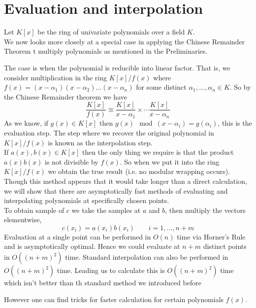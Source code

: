 
\chapter{Evaluation and interpolation}\label{chapter2}

Let $K[x]$ be the ring of univariate polynomials over a field $K$.\\
We now looks more closely at a special case in applying the Chinese Remainder Theorem t multiply polynomials as mentioned in the Preliminaries.

The case is when the polynomial is reducible into linear factor. That is, we consider multiplication in the ring $K[x] / f(x)$ where $f(x) = (x - \alpha_1)(x - \alpha_2) \ldots (x - \alpha_n)$ for some distinct $\alpha_1, \ldots, \alpha_n \in K$. So by the Chinese Remainder theorem we have
\[
    \frac{K[x]}{f(x)} \cong \frac{K[x]}{x - \alpha_1} \times \cdots \frac{K[x]}{x - \alpha_n}
\]
As we know, if $g(x) \in K[x]$ then $g(x) \mod (x - \alpha_i) = g(\alpha_i)$, this is the evaluation step. The step where we recover the original polynomial in $K[x]/f(x)$ is known as the interpolation step.\\

If $a(x), b(x) \in K[x]$ then the only thing we require is that the product $a(x)b(x)$ is not divisible by $f(x)$. So when we put it into the ring $K[x]/f(x)$ we obtain the true result (i.e. no modular wrapping occurs).\\
Though this method appears that it would take longer than a direct calculation, we will show that there are asymptotically fast methods of evaluating and interpolating polynomials at specifically chosen points.\\

To obtain sample of $c$ we take the samples at $a$ and $b$, then multiply the vectors elementwise,
\[
  c(x_i) = a(x_i)b(x_i) \qquad i = 1, \ldots, n + m
\]
Evaluation at a single point can be performed in $O(n)$ time via Horner's Rule and is asymptotically optimal. Hence we could evaluate at $n + m$ distinct points in $O((n + m)^2)$ time. Standard interpolation can also be performed in $O((n+m)^2)$ time. Leading us to calculate this is $O((n + m)^2)$ time which isn't better than th standard method we introduced before

However one can find tricks for faster calculation for certain polynomials $f(x)$.


